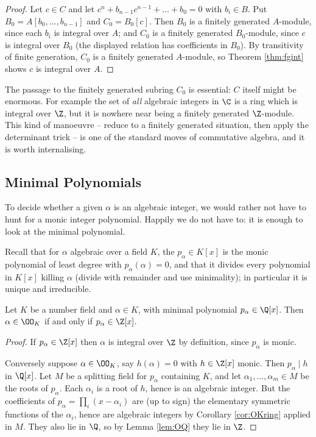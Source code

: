 \begin{proof}
	Let $c \in C$ and let $c^n + b_{n-1}c^{n-1} + \dots + b_0 = 0$ with $b_i \in B$. Put $B_0 = A[b_0, \dots, b_{n-1}]$ and $C_0 = B_0[c]$. Then $B_0$ is a finitely generated $A$-module, since each $b_i$ is integral over $A$; and $C_0$ is a finitely generated $B_0$-module, since $c$ is integral over $B_0$ (the displayed relation has coefficients in $B_0$). By transitivity of finite generation, $C_0$ is a finitely generated $A$-module, so Theorem \ref{thm:fgint} shows $c$ is integral over $A$.
\end{proof}

\begin{remark}
	The passage to the finitely generated subring $C_0$ is essential: $C$ itself might be enormous. For example the set of \emph{all} algebraic integers in $\C$ is a ring which is integral over $\Z$, but it is nowhere near being a finitely generated $\Z$-module. This kind of manoeuvre -- reduce to a finitely generated situation, then apply the determinant trick -- is one of the standard moves of commutative algebra, and it is worth internalising.
\end{remark}

\subsection{Minimal Polynomials}

To decide whether a given $\alpha$ is an algebraic integer, we would rather not have to hunt for a monic integer polynomial. Happily we do not have to: it is enough to look at the minimal polynomial.

Recall that for $\alpha$ algebraic over a field $K$, the  $p_\alpha \in K[x]$ is the monic polynomial of least degree with $p_\alpha(\alpha) = 0$, and that it divides every polynomial in $K[x]$ killing $\alpha$ (divide with remainder and use minimality); in particular it is unique and irreducible.

\begin{proposition}\label{prop:minpolyZ}
	Let $K$ be a number field and $\alpha \in K$, with minimal polynomial $p_\alpha \in \Q[x]$. Then $\alpha \in \OO_K$ if and only if $p_\alpha \in \Z[x]$.
\end{proposition}

\begin{proof}
	If $p_\alpha \in \Z[x]$ then $\alpha$ is integral over $\Z$ by definition, since $p_\alpha$ is monic.

	Conversely suppose $\alpha \in \OO_K$, say $h(\alpha) = 0$ with $h \in \Z[x]$ monic. Then $p_\alpha \mid h$ in $\Q[x]$. Let $M$ be a splitting field for $p_\alpha$ containing $K$, and let $\alpha_1, \dots, \alpha_m \in M$ be the roots of $p_\alpha$. Each $\alpha_i$ is a root of $h$, hence is an algebraic integer. But the coefficients of $p_\alpha = \prod_i (x - \alpha_i)$ are (up to sign) the elementary symmetric functions of the $\alpha_i$, hence are algebraic integers by Corollary \ref{cor:OKring} applied in $M$. They also lie in $\Q$, so by Lemma \ref{lem:OQ} they lie in $\Z$.
\end{proof}

